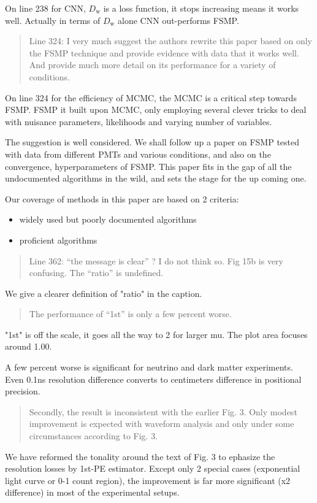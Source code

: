 \documentclass[12pt]{article}
\begin{document}
On line 238 for CNN, $D_\mathrm{w}$ is a loss function, it stops increasing means it works well.  Actually in terms of $D_\mathrm{w}$ alone CNN out-performs FSMP.

\begin{quote}
Line 324: I very much suggest the authors rewrite this paper based on only the FSMP technique and provide evidence with data that it works well. And provide much more detail on its performance for a variety of conditions.
\end{quote}

On line 324 for the efficiency of MCMC, the MCMC is a critical step towards FSMP.  FSMP it built upon MCMC, only employing several clever tricks to deal with nuisance parameters, likelihoods and varying number
of variables.

The suggestion is well considered.  We shall follow up a paper on FSMP tested with data from different PMTs and various conditions, and also on the convergence, hyperparameters of FSMP.  This paper fits in the gap of all the undocumented algorithms in the wild, and sets the stage for the up coming one.

Our coverage of methods in this paper are based on 2 criteria:

\begin{itemize}
    \item widely used but poorly documented algorithms
    \item proficient algorithms
\end{itemize}

\begin{quote}
Line 362: ``the message is clear'' ? I do not think so. Fig 15b is very confusing. The ``ratio'' is undefined. 
\end{quote}

We give a clearer definition of "ratio" in the caption.

\begin{quote}
The performance of ``1st'' is only a few percent worse. 
\end{quote}

"1st" is off the scale, it goes all the way to 2 for larger mu.  The plot area focuses around 1.00.

A few percent worse is significant for neutrino and dark matter experiments.  Even 0.1ns resolution difference converts to centimeters difference in positional precision.

\begin{quote}
Secondly, the result is inconsistent with the earlier Fig. 3. Only modest improvement is expected with waveform analysis and only under some circumstances according to Fig. 3.
\end{quote}

We have reformed the tonality around the text of Fig. 3 to ephasize the resolution losses by 1st-PE estimator.  Except only 2 special cases (exponential light curve or 0-1 count region), the improvement is far more significant (x2 difference) in most of the experimental setups.
\end{document}
